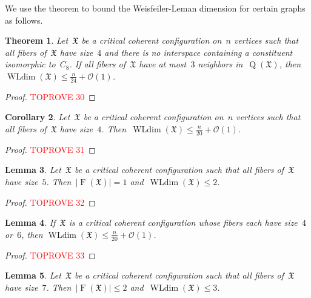 \documentclass[english,a4paper]{article}
\theoremstyle{plain}
\newtheorem{theorem}             {Theorem}[section]
\newtheorem{lemma}      [theorem]{Lemma}
\newtheorem{corollary}  [theorem]{Corollary}
\theoremstyle{definition}
\newcommand{\abs}[1]{| #1 |}
\DeclareMathOperator{\Fibers}{F}
\newcommand{\coherentConfig}{\ensuremath{\mathfrak{X}}}
\newcommand{\fibers}[1]{\ensuremath{\Fibers \left( #1 \right)}}
\DeclareMathOperator*{\WLdim}{WLdim}
\newcommand{\wldim}[1]{\ensuremath{\WLdim\left(#1\right)}}
\DeclareMathOperator*{\Quotient}{Q}
\newcommand{\quotientGraph}[1]{\ensuremath{\Quotient(#1)}}
\newcommand{\cycle}[1]{\ensuremath{C_{#1}}}
\begin{document}
We use the theorem to bound the Weisfeiler-Leman dimension for certain graphs as follows.


\begin{theorem}
\label{4-cc:cfi-wldim/thm}
    Let~$\coherentConfig$ be a critical coherent configuration on~$n$ vertices such that all fibers of~$\coherentConfig$ have size~$4$ and there is no interspace containing a constituent isomorphic to~$\cycle{8}$.
    If all fibers of~$\coherentConfig$ have at most~$3$ neighbors in~$\quotientGraph{\coherentConfig}$, then~$\wldim{\coherentConfig} \leq \frac{n}{24} + \mathcal{O}(1)$.
\end{theorem}
\begin{proof}\textcolor{red}{TOPROVE 30}\end{proof}


\begin{corollary}
\label{4-cc:wldim/cor}
    Let~$\coherentConfig$ be a critical coherent configuration on~$n$ vertices such that all fibers of~$\coherentConfig$ have size~$4$.
    Then~$\wldim{\coherentConfig} \leq \frac{n}{20} + \mathcal{O}(1)$.
\end{corollary}
\begin{proof}\textcolor{red}{TOPROVE 31}\end{proof}


\begin{lemma}
\label{5-cc:wldim/lem}
    Let~$\coherentConfig$ be a critical coherent configuration such that all fibers of~$\coherentConfig$ have size~$5$.
    Then~$\abs{\fibers{\coherentConfig}} = 1$ and~$\wldim{\coherentConfig} \leq 2$.
\end{lemma}
\begin{proof}\textcolor{red}{TOPROVE 32}\end{proof}


\begin{lemma}
\label{6-cc:wldim/lem}
    If~$\coherentConfig$ is a critical coherent configuration whose fibers each have size~$4$ or~$6$, then $\wldim{\coherentConfig} \leq \frac{n}{20}+ \mathcal{O}(1)$.
\end{lemma}
\begin{proof}\textcolor{red}{TOPROVE 33}\end{proof}


\begin{lemma}
\label{7-cc:wldim/lem}
    Let~$\coherentConfig$ be a critical coherent configuration such that all fibers of~$\coherentConfig$ have size~$7$.
    Then~$\abs{\fibers{\coherentConfig}} \leq 2$ and~$\wldim{\coherentConfig} \leq 3$.
\end{lemma}
\end{document}
